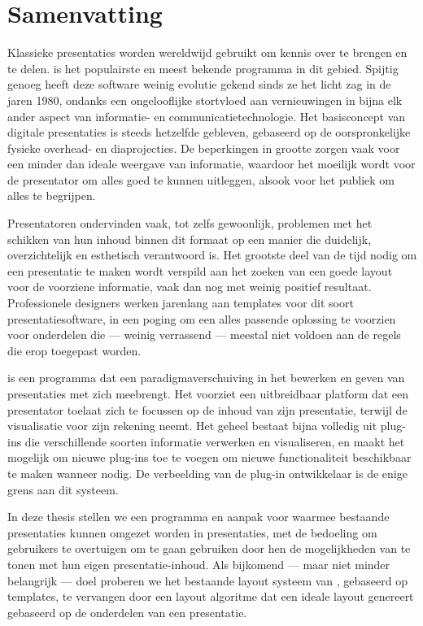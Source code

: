 
 \chapter*{Samenvatting}

  Klassieke presentaties worden wereldwijd gebruikt om kennis over te
  brengen en te delen. \ppt* is het populairste en meest bekende programma in
  dit gebied. Spijtig genoeg heeft deze software weinig evolutie gekend sinds
  ze het licht zag in de jaren 1980, ondanks een ongelooflijke stortvloed aan
  vernieuwingen in bijna elk ander aspect van informatie- en
  communicatietechnologie. Het basisconcept van digitale presentaties is steeds
  hetzelfde gebleven, gebaseerd op de oorspronkelijke fysieke overhead- en
  diaprojecties. De beperkingen in grootte zorgen vaak voor een minder dan
  ideale weergave van informatie, waardoor het moeilijk wordt voor de
  presentator om alles goed te kunnen uitleggen, alsook voor het publiek om
  alles te begrijpen.

  Presentatoren ondervinden vaak, tot zelfs gewoonlijk, problemen met het
  schikken van hun inhoud binnen dit formaat op een manier die duidelijk,
  overzichtelijk en esthetisch verantwoord is. Het grootste deel van de tijd
  nodig om een presentatie te maken wordt verspild aan het zoeken van een goede
  layout voor de voorziene informatie, vaak dan nog met weinig positief
  resultaat. Professionele designers werken jarenlang aan templates voor dit
  soort presentatiesoftware, in een poging om een alles passende oplossing te
  voorzien voor onderdelen die --- weinig verrassend --- meestal niet voldoen
  aan de regels die erop toegepast worden.

  \mxp is een programma dat een paradigmaverschuiving in het bewerken en geven
  van presentaties met zich meebrengt. Het voorziet een uitbreidbaar platform
  dat een presentator toelaat zich te focussen op de inhoud van zijn
  presentatie, terwijl \mxp de visualisatie voor zijn rekening neemt. Het
  geheel bestaat bijna volledig uit plug-ins die verschillende soorten
  informatie verwerken en visualiseren, en maakt het mogelijk om nieuwe
  plug-ins toe te voegen om nieuwe functionaliteit beschikbaar te maken wanneer
  nodig. De verbeelding van de plug-in ontwikkelaar is de enige grens aan dit
  systeem.

  In deze thesis stellen we een programma en aanpak voor waarmee bestaande \ppt
  presentaties kunnen omgezet worden in \mxp presentaties, met de bedoeling om
  \ppt gebruikers te overtuigen om \mxp te gaan gebruiken door hen de
  mogelijkheden van \mxp te tonen met hun eigen presentatie-inhoud. Als
  bijkomend --- maar niet minder belangrijk --- doel proberen we het bestaande
  layout systeem van \mxp, gebaseerd op templates, te vervangen door een layout
  algoritme dat een ideale layout genereert gebaseerd op de onderdelen van een
  presentatie.

